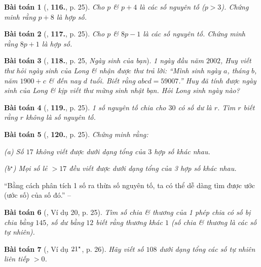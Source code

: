\documentclass{article}
\numberwithin{equation}{section}
\newtheorem{baitoan}{Bài toán}[section]
\begin{document}
\begin{baitoan}[\cite{Binh_Toan_6_tap_1}, \textbf{116.}, p. 25]
	Cho $p$ \& $p + 4$ là các số nguyên tố ($p > 3$). Chứng minh rằng $p + 8$ là hợp số.
\end{baitoan}

\begin{baitoan}[\cite{Binh_Toan_6_tap_1}, \textbf{117.}, p. 25]
	Cho $p$ \& $8p - 1$ là các số nguyên tố. Chứng minh rằng $8p + 1$ là hợp số.
\end{baitoan}

\begin{baitoan}[\cite{Binh_Toan_6_tap_1}, \textbf{118.}, p. 25, \textit{Ngày sinh của bạn}]
	1 ngày đầu năm $2002$, Huy viết thư hỏi ngày sinh của Long \& nhận được thư trả lời: ``Mình sinh ngày $a$, tháng $b$, năm $1900 + c$ \& đến nay $d$ tuổi. Biết rằng $abcd = 59007$.'' Huy đã tính được ngày sinh của Long \& kịp viết thư mừng sinh nhật bạn. Hỏi Long sinh ngày nào?
\end{baitoan}

\begin{baitoan}[\cite{Binh_Toan_6_tap_1}, \textbf{119.}, p. 25]
	1 số nguyên tố chia cho $30$ có số dư là $r$. Tìm $r$ biết rằng $r$ không là số nguyên tố.
\end{baitoan}

\begin{baitoan}[\cite{Binh_Toan_6_tap_1}, \textbf{120.}, p. 25]
	Chứng minh rằng:
	\begin{enumerate*}
		\item[(a)] Số $17$ không viết được dưới dạng tổng của $3$ hợp số khác nhau.
		\item[(b${}^\star$)] Mọi số lẻ $> 17$ đều viết được dưới dạng tổng của 3 hợp số khác nhau.
	\end{enumerate*}
\end{baitoan}
``Bằng cách phân tích 1 số ra thừa số nguyên tố, ta có thể dễ dàng tìm được ước (ước số) của số đó.'' -- \cite[\S6, p. 25]{Binh_Toan_6_tap_1}

\begin{baitoan}[\cite{Binh_Toan_6_tap_1}, Ví dụ 20, p. 25]
	Tìm số chia \& thương của 1 phép chia có số bị chia bằng $145$, số dư bằng $12$ biết rằng thương khác $1$ (số chia \& thương là các số tự nhiên).
\end{baitoan}

\begin{baitoan}[\cite{Binh_Toan_6_tap_1}, Ví dụ $\rm 21^\star$, p. 26]
	Hãy viết số $108$ dưới dạng tổng các số tự nhiên liên tiếp $> 0$.
\end{baitoan}
\end{document}
